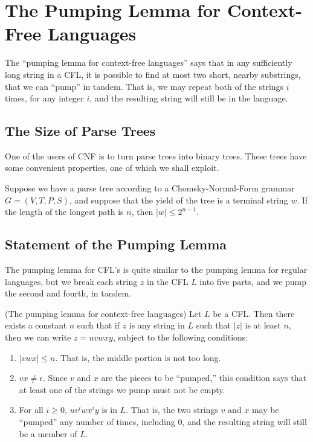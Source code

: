 \documentclass[]{article}
\begin{document}
\section*{The Pumping Lemma for Context-Free Languages}
  The ``pumping lemma for context-free languages'' says that in any sufficiently
  long string in a CFL, it is possible to find at most two short, nearby
  substrings, that we can ``pump'' in tandem. That is, we may repeat both of the
  strings $i$ times, for any integer $i$, and the resulting string will still be
  in the language.

  \subsection*{The Size of Parse Trees}
    One of the users of CNF is to turn parse trees into binary trees. These
    trees have some convenient properties, one of which we shall exploit.
      \begin{thm}
        Suppose we have a parse tree according to a Chomsky-Normal-Form grammar
        $G = (V,T,P,S)$, and suppose that the yield of the tree is a terminal
        string $w$. If the length of the longest path is $n$, then
        $|w| \leq 2^{n-1}$.
      \end{thm}

  \subsection*{Statement of the Pumping Lemma}
    The pumping lemma for CFL's is quite similar to the pumping lemma for
    regular languages, but we break each string $z$ in the CFL $L$ into five
    parts, and we pump the second and fourth, in tandem.
      \begin{thm}
        (The pumping lemma for context-free languages) Let $L$ be a CFL. Then
        there exists a constant $n$ such that if $z$ is any string in $L$ such
        that $|z|$ is at least $n$, then we can write $z = uvwxy$, subject to
        the following conditions:
          \begin{enumerate}
            \item $|vwx| \leq n$. That is, the middle portion is not too long.
            \item $vx \neq \epsilon$. Since $v$ and $x$ are the pieces to be
            ``pumped,'' this condition says that at least one of the strings we
            pump must not be empty.
            \item For all $i \geq 0$, $uv^iwx^iy$ is in $L$. That is, the two
            strings $v$ and $x$ may be ``pumped'' any number of times, including
            0, and the resulting string will still be a member of $L$.
          \end{enumerate}
      \end{thm}
\end{document}
